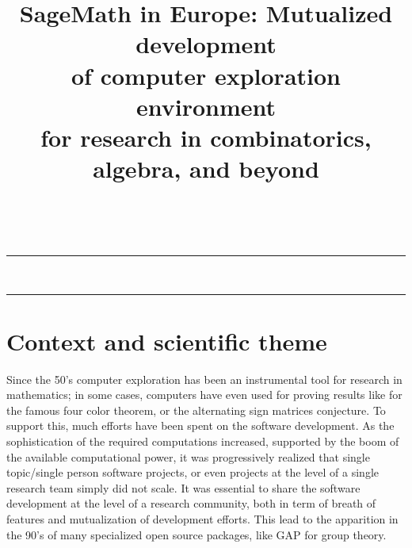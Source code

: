 \documentclass[a4,12pt]{amsart}
\title[SageMath in Europe]{SageMath in Europe: Mutualized development\\
  of computer exploration environment\\
  for research in combinatorics, algebra, and beyond
}
\date{}
\newcommand{\sage}{\href{http://www.sagemath.org/}{\texttt{Sage}}\xspace}
\newcommand{\TODO}[2][To do: ]{{\textcolor{red}{\textbf{#1#2}}}}
\begin{document}
\ \vspace{-1.5cm}
\hrule
\medskip
\maketitle
\ \vspace{-1cm}
\hrule





\section{Context and scientific theme}


Since the 50's computer exploration has been an instrumental tool for
research in mathematics; in some cases, computers have even used for
proving results like for the famous four color theorem, or the
alternating sign matrices conjecture.
To support this, much efforts have been spent on the software
development. As the sophistication of the required computations
increased, supported by the boom of the available computational power,
it was progressively realized that single topic/single person software
projects, or even projects at the level of a single research team
simply did not scale. It was essential to share the software
development at the level of a research community, both in term of
breath of features and mutualization of development efforts. This lead
to the apparition in the 90's of many specialized open source
packages, like GAP for group theory.
\end{document}
